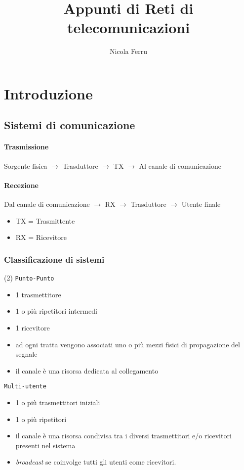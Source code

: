 \documentclass{book}
\title{Appunti di Reti di telecomunicazioni}
\author{Nicola Ferru}
\date{}
\begin{document}
\maketitle
\tableofcontents
\listoftables
\listoffigures
\chapter{Introduzione}

\section{Sistemi di comunicazione}
\subsubsection{Trasmissione}
Sorgente fisica $\to$ Trasduttore $\to$ TX $\to$ Al canale di comunicazione
\subsubsection{Recezione}
Dal canale di comunicazione $\to$ RX $\to$ Trasduttore $\to$ Utente finale
\begin{itemize}
	\item TX = Trasmittente
	\item RX = Ricevitore
\end{itemize}
\subsection{Classificazione di sistemi}
\begin{tasks}(2)
	\task \texttt{Punto-Punto}
	\begin{itemize}
		\item 1 trasmettitore
		\item 1 o più ripetitori intermedi
		\item 1 ricevitore
		\item ad ogni tratta vengono associati uno o più mezzi fisici di
			propagazione del segnale
		\item il canale è una risorsa dedicata al collegamento
	\end{itemize}
	\task \texttt{Multi-utente}
	\begin{itemize}
		\item 1 o più trasmettitori iniziali
		\item 1 o più ripetitori
		\item il canale è una risorsa condivisa tra i diversi trasmettitori e/o
			ricevitori presenti nel sistema
		\item \textit{broadcast} se coinvolge tutti gli utenti come ricevitori.
	\end{itemize}
\end{tasks}
\end{document}
